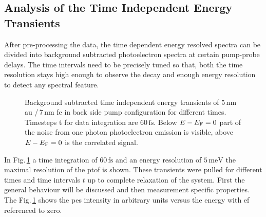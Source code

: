 \documentclass[a4paper,12pt,twoside]{article}
\begin{document}
        \subsection{Analysis of the Time Independent Energy Transients}
            \label{chapATIET}
After pre-processing the data, the time dependent energy resolved spectra can be divided into background subtracted photoelectron spectra at certain pump-probe delays. The time intervals need to be precisely tuned so that, both the time resolution stays high enough to observe the decay and enough energy resolution to detect any spectral feature.
	\begin{figure}[H]
		\caption{Background subtracted time independent energy transients of $5\,\mathrm{\mbox{nm}}$ \gls{au} /\,$7\,\mathrm{\mbox{nm}}$ \gls{fe} in back side pump configuration for different times. Timesteps \textDelta t for data integration are $60\,\mathrm{fs}$. Below $E - E_{\rm{F}}=0$ part of the noise from one photon photoelectron emission is visible, above $E - E_{\rm{F}}=0$ is the correlated signal.}
    		\label{transients1}
	\end{figure}
\noindent In Fig.\,\ref{transients1} a time integration of $60\,\mathrm{\mbox{fs}}$ and an energy resolution of $5\,\mathrm{\mbox{meV}}$ the maximal resolution of the \gls{ptof} is shown. These transients were pulled for different times and time intervals \textDelta$t$ up to complete relaxation of the system. First the general behaviour will be discussed and then measurement specific properties. The Fig.\,\ref{transients1} shows the \gls{pes} intensity in arbitrary units versus the energy with \gls{ef} referenced to zero.
\end{document}
